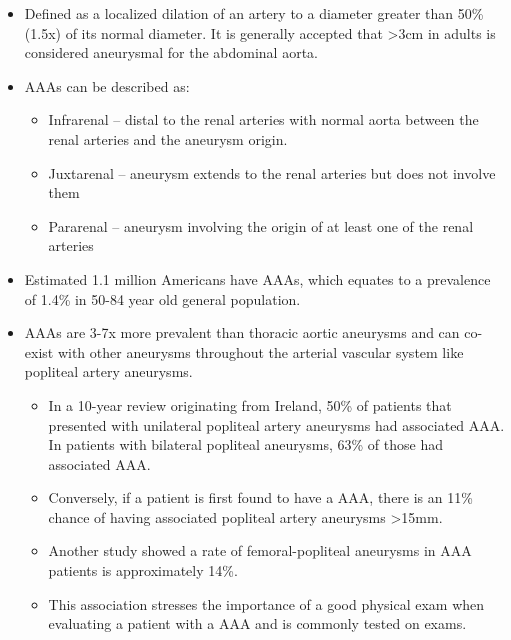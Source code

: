 \documentclass[
]{book}
\begin{document}
\begin{itemize}
\item
  Defined as a localized dilation of an artery to a diameter greater
  than 50\% (1.5x) of its normal diameter. It is generally accepted
  that \textgreater3cm in adults is considered aneurysmal for the abdominal
  aorta.
\item
  AAAs can be described as:

  \begin{itemize}
  \item
    Infrarenal -- distal to the renal arteries with normal aorta
    between the renal arteries and the aneurysm origin.
  \item
    Juxtarenal -- aneurysm extends to the renal arteries but does
    not involve them
  \item
    Pararenal -- aneurysm involving the origin of at least one of
    the renal arteries
  \end{itemize}
\item
  Estimated 1.1 million Americans have AAAs, which equates to a
  prevalence of 1.4\% in 50-84 year old general population.
\item
  AAAs are 3-7x more prevalent than thoracic aortic aneurysms and can
  co-exist with other aneurysms throughout the arterial vascular
  system like popliteal artery aneurysms.

  \begin{itemize}
  \item
    In a 10-year review originating from Ireland, 50\% of patients
    that presented with unilateral popliteal artery aneurysms had
    associated AAA. In patients with bilateral popliteal aneurysms,
    63\% of those had associated AAA.
    \citep{duffyPoplitealAneurysms10year1998}
  \item
    Conversely, if a patient is first found to have a AAA, there is
    an 11\% chance of having associated popliteal artery
    aneurysms \textgreater15mm. \citep{tuvesonPatientsAbdominalAortic2016}
  \item
    Another study showed a rate of femoral-popliteal aneurysms in
    AAA patients is approximately 14\%.
    \citep{diwanIncidenceFemoralPopliteal2000}
  \item
    This association stresses the importance of a good physical exam
    when evaluating a patient with a AAA and is commonly tested on
    exams.
  \end{itemize}
\end{itemize}
\end{document}
